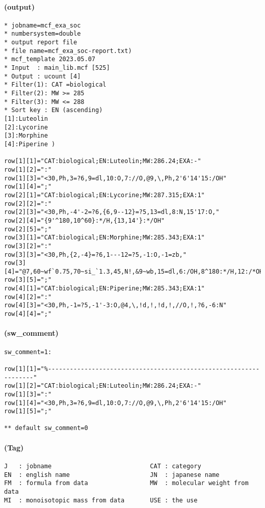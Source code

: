 \documentclass[a4paper]{article}
\begin{document}
\paragraph{(output)}
\begin{verbatim}
* jobname=mcf_exa_soc
* numbersystem=double
* output report file
* file name=mcf_exa_soc-report.txt)
* mcf_template 2023.05.07
* Input  : main_lib.mcf [525]
* Output : ucount [4]
* Filter(1): CAT =biological
* Filter(2): MW >= 285
* Filter(3): MW <= 288
* Sort key : EN (ascending)
[1]:Luteolin
[2]:Lycorine
[3]:Morphine
[4]:Piperine )

row[1][1]="CAT:biological;EN:Luteolin;MW:286.24;EXA:-"
row[1][2]=":"
row[1][3]="<30,Ph,3=?6,9=dl,10:O,7://O,@9,\,Ph,2'6'14'15:/OH"
row[1][4]=";"
row[2][1]="CAT:biological;EN:Lycorine;MW:287.315;EXA:1"
row[2][2]=":"
row[2][3]="<30,Ph,-4'-2=?6,{6,9--12}=?5,13=dl,8:N,15'17:O,"
row[2][4]="{9'^180,10^60}:*/H,{13,14'}:*/OH"
row[2][5]=";"
row[3][1]="CAT:biological;EN:Morphine;MW:285.343;EXA:1"
row[3][2]=":"
row[3][3]="<30,Ph,{2,-4}=?6,1---12=?5,-1:O,-1=zb,"
row[3][4]="@7,60~wf`0.75,70~si_`1.3,45,N!,&9~wb,15=dl,6:/OH,8^180:*/H,12:/*OH"
row[3][5]=";"
row[4][1]="CAT:biological;EN:Piperine;MW:285.343;EXA:1"
row[4][2]=":"
row[4][3]="<30,Ph,-1=?5,-1'-3:O,@4,\,!d,!,!d,!,//O,!,?6,-6:N"
row[4][4]=";"
\end{verbatim}
\paragraph{(sw\_comment)}
\begin{verbatim}
sw_comment=1:

row[1][1]="%------------------------------------------------------------------"
row[1][2]="CAT:biological;EN:Luteolin;MW:286.24;EXA:-"
row[1][3]=":"
row[1][4]="<30,Ph,3=?6,9=dl,10:O,7://O,@9,\,Ph,2'6'14'15:/OH"
row[1][5]=";"

** default sw_comment=0
\end{verbatim}
\paragraph{(Tag)}
\begin{verbatim}
J   : jobname                           CAT : category
EN  : english name                      JN  : japanese name
FM  : formula from data                 MW  : molecular weight from data
MI  : monoisotopic mass from data       USE : the use
\end{verbatim}
\newpage
\noindent%
\newpage
\end{document}
